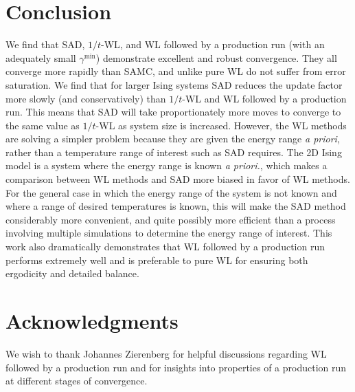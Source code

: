 \section{Conclusion}
We find that SAD, $1/t$-WL, and WL followed by a production run (with an
adequately small $\gamma^{\min}$) demonstrate excellent and robust
convergence. They all converge more rapidly than SAMC, and unlike pure
WL do not suffer from error saturation. We find that for larger Ising
systems SAD reduces the update factor more slowly (and conservatively)
than $1/t$-WL and WL followed by a production run. This means that SAD
will take proportionately more moves to converge to the same value as
$1/t$-WL as system size is increased.  However, the WL methods are
solving a simpler problem because they are given the energy range
\emph{a priori}, rather than a temperature range of interest such as
SAD requires.  The 2D Ising model is a system where the energy range
is known \emph{a priori.}, which makes a comparison between WL methods
and SAD more biased in favor of WL methods. For the general case in
which the energy range of the system is not known and where a range of
desired temperatures is known, this will make the SAD method
considerably more convenient, and quite possibly more efficient than a
process involving multiple simulations to determine the energy range
of interest. This work also dramatically demonstrates that WL followed
by a production run performs extremely well and is preferable to pure
WL for ensuring both ergodicity and detailed balance.

\section{Acknowledgments}
We wish to thank Johannes Zierenberg for helpful discussions regarding WL followed by a production run and for insights into properties of a production run at different stages of convergence.

